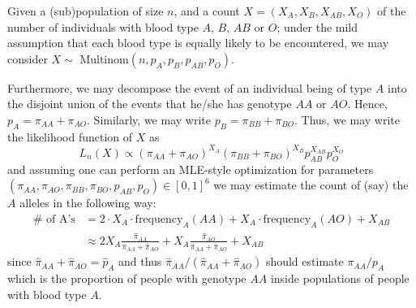 \documentclass[12pt]{article}
\begin{document}
 Given a (sub)population of size $n$, and a count $X=(X_A, X_{B}, X_{AB}, X_{O})$ of the number of individuals with blood type $A$, $B$, $AB$ or $O$; under the mild assumption that each blood type is equally likely to be encountered, we may consider $X \sim$ Multinom$(n,p_{A}, p_{B}, p_{AB}, p_{O})$. 

Furthermore, we may decompose the event of an individual being of type $A$ into the disjoint union of the events that he/she has genotype $AA$ or $AO$. Hence, $p_{A} = \pi_{AA} + \pi_{AO}$. Similarly, we may write $p_{B} = \pi_{BB} + \pi_{BO}$. Thus, we may write the likelihood function of $X$ as 
\[
L_{n}(X) \propto (\pi_{AA} + \pi_{AO})^{X_A}(\pi_{BB} + \pi_{BO})^{X_B}p_{AB}^{X_{AB}} p_{O}^{X_{O}}
\]
and assuming one can perform an MLE-style optimization for parameters $(\pi_{AA},\pi_{AO},\pi_{BB},\pi_{BO},p_{AB},p_{O})\in[0,1]^{6}$ we may estimate the count of (say) the $A$ alleles in the following way:
\begin{align*}
\#\text{ of A's} &= 2 \cdot X_{A} \cdot \text{frequency}_{A}(AA) + X_{A} \cdot \text{frequency}_{A}(AO) + X_{AB} \\
&\approx 2 X_{A} \frac{\hat{\pi}_{AA}}{\hat{\pi}_{AA} + \hat{\pi}_{AO}} + X_{A} \frac{\hat{\pi}_{AO}}{\hat{\pi}_{AA} + \hat{\pi}_{AO}} + X_{AB}
\end{align*}
since $\hat{\pi}_{AA} + \hat{\pi}_{AO} = \hat{p}_{A}$ and thus ${\hat{\pi}_{AA}}/(\hat{\pi}_{AA} + \hat{\pi}_{AO})$ should estimate $\pi_{AA}/p_{A}$ which is the proportion of people with genotype $AA$ inside populations of people with blood type $A$. 
\end{document}
